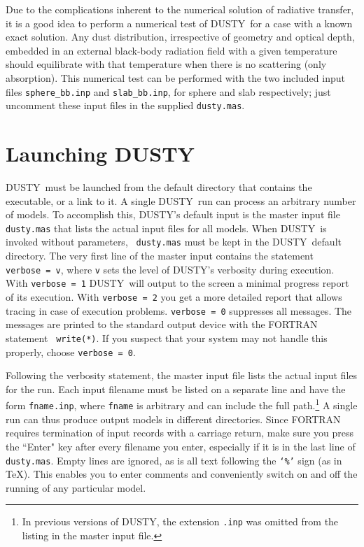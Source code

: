 \documentclass[11pt]{article}
\def\D    {{\sf DUSTY}}
\begin{document}
Due to the complications inherent to the numerical solution of
radiative transfer, it is a good idea to perform a numerical test of
\D\ for a case with a known exact solution. Any dust distribution,
irrespective of geometry and optical depth, embedded in an external
black-body radiation field with a given temperature should equilibrate
with that temperature when there is no scattering (only
absorption). This numerical test can be performed with the two
included input files {\tt sphere\_bb.inp} and {\tt slab\_bb.inp}, for
sphere and slab respectively; just uncomment these input files in the
supplied {\tt dusty.mas}.


\section{Launching \D}
\label{sec:launch}

\D\ must be launched from the default directory that contains the
executable, or a link to it. A single \D\ run can process an arbitrary
number of models.  To accomplish this, \D's default input is the
master input file {\tt dusty.mas} that lists the actual input files
for all models. When \D\ is invoked without parameters, {\tt
  dusty.mas} must be kept in the \D\ default directory. The very first
line of the master input contains the statement {\tt verbose~=~v},
where {\tt v} sets the level of \D's verbosity during execution.  With
{\tt verbose~=~1} \D\ will output to the screen a minimal progress
report of its execution. With {\tt verbose~=~2} you get a more
detailed report that allows tracing in case of execution
problems. {\tt verbose~=~0} suppresses all messages. The messages are
printed to the standard output device with the FORTRAN statement {\tt
  write(*)}. If you suspect that your system may not handle this
properly, choose {\tt verbose = 0}.

Following the verbosity statement, the master input file lists the
actual input files for the run. Each input filename must be listed on
a separate line and have the form {\tt fname.inp}, where {\tt fname}
is arbitrary and can include the full path.\footnote{In previous
  versions of \D, the extension {\tt .inp} was omitted from the
  listing in the master input file.} A single run can thus produce
output models in different directories. Since FORTRAN requires
termination of input records with a carriage return, make sure you
press the ``Enter" key after every filename you enter, especially if
it is in the last line of {\tt dusty.mas}. Empty lines are ignored, as
is all text following the {\tt `\%'} sign (as in \TeX).  This enables
you to enter comments and conveniently switch on and off the running
of any particular model.
\end{document}
